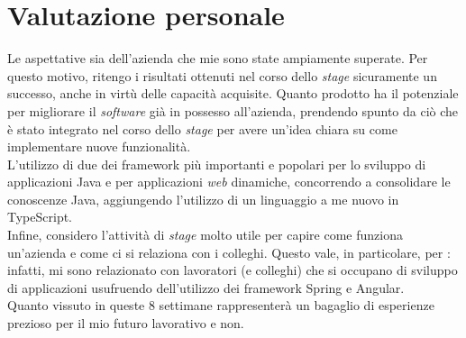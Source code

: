 \section{Valutazione personale}
Le aspettative sia dell’azienda che mie sono state ampiamente superate. Per questo motivo, ritengo i risultati ottenuti nel corso dello \textit{stage} sicuramente un successo, anche in virtù delle capacità acquisite. Quanto prodotto ha il potenziale per migliorare il \textit{software} già in possesso all'azienda, prendendo spunto da ciò che è stato integrato nel corso dello \textit{stage} per avere un'idea chiara su come implementare nuove funzionalità. \\
L'utilizzo di due dei \gls{framework} più importanti e popolari per lo sviluppo di applicazioni Java e per applicazioni \textit{web} dinamiche, concorrendo a consolidare le conoscenze Java, aggiungendo l'utilizzo di un linguaggio a me nuovo in TypeScript.  \\
Infine, considero l'attività di \textit{stage} molto utile per capire come funziona un'azienda e come ci si relaziona con i colleghi. Questo vale, in particolare, per \myCompany: infatti, mi sono relazionato con lavoratori (e colleghi) che si occupano di sviluppo di applicazioni usufruendo dell'utilizzo dei \gls{framework} Spring e Angular.\\
Quanto vissuto in queste 8 settimane rappresenterà un bagaglio di esperienze prezioso per il mio futuro lavorativo e non.